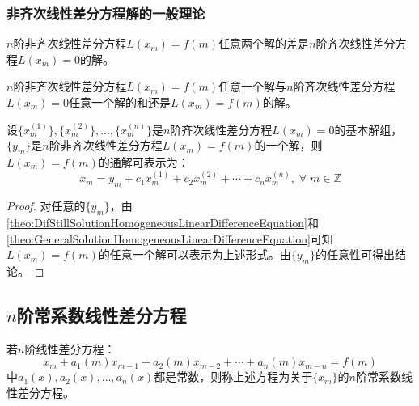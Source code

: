 \subsubsection{非齐次线性差分方程解的一般理论}
\begin{theorem}\label{theo:DifStillSolutionHomogeneousLinearDifferenceEquation}
	$n$阶非齐次线性差分方程$L(x_m)=f(m)$任意两个解的差是$n$阶齐次线性差分方程$L(x_m)=0$的解。
\end{theorem}
\begin{theorem}\label{theo:AddStillSolutionNonhomogeneousLinearDifferenceEquation}
	$n$阶非齐次线性差分方程$L(x_m)=f(m)$任意一个解与$n$阶齐次线性差分方程$L(x_m)=0$任意一个解的和还是$L(x_m)=f(m)$的解。
\end{theorem}
\begin{theorem}\label{theo:GeneralSolutionNonhomogeneousLinearDifferenceEquation}
	设$\{x_m^{(1)}\},\{x_m^{(2)}\},\dots,\{x_m^{(n)}\}$是$n$阶齐次线性差分方程$L(x_m)=0$的基本解组，$\{y_m\}$是$n$阶非齐次线性差分方程$L(x_m)=f(m)$的一个解，则$L(x_m)=f(m)$的通解可表示为：
	\begin{equation*}
		x_m=y_m+c_1x_m^{(1)}+c_2x_m^{(2)}+\cdots+c_nx_m^{(n)},\;\forall\;m\in\mathbb{Z}
	\end{equation*}
\end{theorem}
\begin{proof}
	对任意的$\{y_m\}$，由\cref{theo:DifStillSolutionHomogeneousLinearDifferenceEquation}和\cref{theo:GeneralSolutionHomogeneousLinearDifferenceEquation}可知$L(x_m)=f(m)$的任意一个解可以表示为上述形式。由$\{y_m\}$的任意性可得出结论。
\end{proof}

\subsection{$n$阶常系数线性差分方程}
\begin{definition}
	若$n$阶线性差分方程：
	\begin{equation*}
		x_m+a_1(m)x_{m-1}+a_2(m)x_{m-2}+\cdots+a_n(m)x_{m-n}=f(m)
	\end{equation*}
	中$a_1(x),a_2(x),\dots,a_n(x)$都是常数，则称上述方程为关于$\{x_m\}$的$n$阶常系数线性差分方程。
\end{definition}
